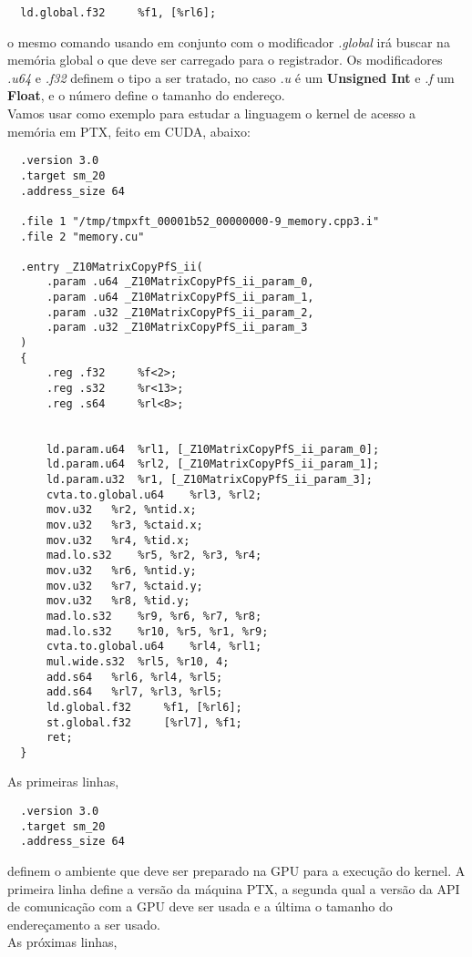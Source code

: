 \begin{lstlisting}
  ld.global.f32 	%f1, [%rl6];
\end{lstlisting}

o mesmo comando usando em conjunto com o modificador \textit{.global} irá buscar na memória global o que deve ser carregado para o registrador.
Os modificadores \textit{.u64} e \textit{.f32} definem o tipo a ser tratado, no caso \textit{.u} é um \textbf{Unsigned Int} e \textit{.f} um
\textbf{Float}, e o número define o tamanho do endereço. \\

Vamos usar como exemplo para estudar a linguagem o kernel de acesso a memória em PTX, feito em CUDA, abaixo:

\begin{lstlisting}
  .version 3.0
  .target sm_20
  .address_size 64

  .file	1 "/tmp/tmpxft_00001b52_00000000-9_memory.cpp3.i"
  .file	2 "memory.cu"

  .entry _Z10MatrixCopyPfS_ii(
	  .param .u64 _Z10MatrixCopyPfS_ii_param_0,
	  .param .u64 _Z10MatrixCopyPfS_ii_param_1,
	  .param .u32 _Z10MatrixCopyPfS_ii_param_2,
	  .param .u32 _Z10MatrixCopyPfS_ii_param_3
  )
  {
	  .reg .f32 	%f<2>;
	  .reg .s32 	%r<13>;
	  .reg .s64 	%rl<8>;


	  ld.param.u64 	%rl1, [_Z10MatrixCopyPfS_ii_param_0];
	  ld.param.u64 	%rl2, [_Z10MatrixCopyPfS_ii_param_1];
	  ld.param.u32 	%r1, [_Z10MatrixCopyPfS_ii_param_3];
	  cvta.to.global.u64 	%rl3, %rl2;
	  mov.u32 	%r2, %ntid.x;
	  mov.u32 	%r3, %ctaid.x;
	  mov.u32 	%r4, %tid.x;
	  mad.lo.s32 	%r5, %r2, %r3, %r4;
	  mov.u32 	%r6, %ntid.y;
	  mov.u32 	%r7, %ctaid.y;
	  mov.u32 	%r8, %tid.y;
	  mad.lo.s32 	%r9, %r6, %r7, %r8;
	  mad.lo.s32 	%r10, %r5, %r1, %r9;
	  cvta.to.global.u64 	%rl4, %rl1;
	  mul.wide.s32 	%rl5, %r10, 4;
	  add.s64 	%rl6, %rl4, %rl5;
	  add.s64 	%rl7, %rl3, %rl5;
	  ld.global.f32 	%f1, [%rl6];
	  st.global.f32 	[%rl7], %f1;
	  ret;
  }
\end{lstlisting}

As primeiras linhas,

\begin{lstlisting}
  .version 3.0
  .target sm_20
  .address_size 64
\end{lstlisting}

definem o ambiente que deve ser preparado na GPU para a execução do kernel. A primeira linha define a versão da máquina PTX, a segunda
qual a versão da API de comunicação com a GPU deve ser usada e a última o tamanho do endereçamento a ser usado. \\
As próximas linhas, 

